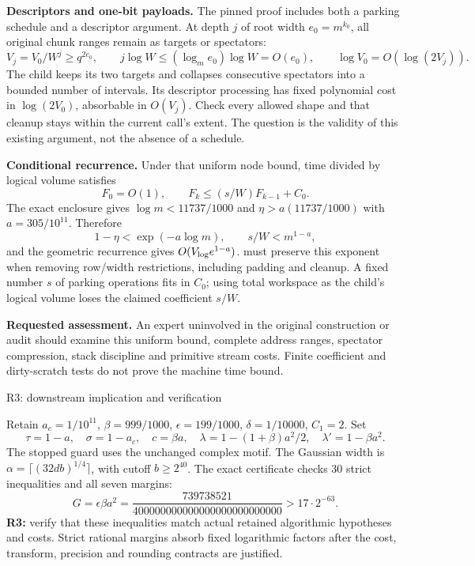 \documentclass[10pt]{article}
\newcommand{\src}[1]{\texttt{\detokenize{#1}}}
\begin{document}
\textbf{Descriptors and one-bit payloads.} The pinned proof includes both a
parking schedule and a descriptor argument. At depth $j$ of root width
$e_0=m^{k_0}$, all original chunk ranges remain as targets or spectators:
\[
 V_j=V_0/W^j\ge q^{2e_0},\qquad
 j\log W\le(\log_m e_0)\log W=O(e_0),\qquad
 \log V_0=O(\log(2V_j)).
\]
The child keeps its two targets and collapses consecutive spectators into a
bounded number of intervals. Its descriptor processing has fixed polynomial
cost in $\log(2V_0)$, absorbable in $O(V_j)$. Check every allowed shape and that
cleanup stays within the current call's extent. The question is the validity
of this existing argument, not the absence of a schedule.

\textbf{Conditional recurrence.} Under that uniform node bound, time divided
by logical volume satisfies
\[
 F_0=O(1),\qquad F_k\le(s/W)F_{k-1}+C_0.
\]
The exact enclosure gives $\log m<11737/1000$ and $\eta>a(11737/1000)$ with
$a=305/10^{11}$. Therefore
\[
 1-\eta<\exp(-a\log m),\qquad s/W<m^{1-a},
\]
and the geometric recurrence gives $O(V_{\rm log}e^{1-a})$.
\src{lem:chunk-swap} must preserve this exponent when removing row/width
restrictions, including padding and cleanup. A fixed number $s$ of parking
operations fits in $C_0$; using total workspace as the child's logical volume
loses the claimed coefficient $s/W$.

\textbf{Requested assessment.} An expert uninvolved in the original
construction or audit should examine this uniform bound, complete address
ranges, spectator compression, stack discipline and primitive stream costs.
Finite coefficient and dirty-scratch tests do not prove the machine time bound.

\newpage
\begin{center}{\large R3: downstream implication and verification}\end{center}
Retain $a_c=1/10^{11}$, $\beta=999/1000$, $\epsilon=199/1000$,
$\delta=1/10000$, $C_1=2$. Set
\[
 \tau=1-a,\quad\sigma=1-a_c,\quad c=\beta a,\quad
 \lambda=1-(1+\beta)a^2/2,\quad\lambda'=1-\beta a^2.
\]
The stopped guard uses the unchanged complex motif. The Gaussian width is
$\alpha=\lceil(32db)^{1/4}\rceil$, with cutoff $b\ge2^{40}$.
The exact certificate checks 30 strict inequalities and all seven margins:
\[
 G=\epsilon\beta a^2=
 \frac{739738521}{400000000000000000000000000}>17\cdot2^{-63}.
\]
\textbf{R3:} verify that these inequalities match actual retained algorithmic
hypotheses and costs. Strict rational margins absorb fixed logarithmic factors
after the cost, transform, precision and rounding contracts are justified.
\end{document}

